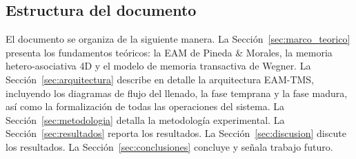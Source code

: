 \subsection*{Estructura del documento}

El documento se organiza de la siguiente manera.
La Sección~\ref{sec:marco_teorico} presenta los fundamentos teóricos: la EAM de Pineda
\& Morales, la memoria hetero-asociativa 4D y el modelo de memoria transactiva de Wegner.
La Sección~\ref{sec:arquitectura} describe en detalle la arquitectura EAM-TMS, incluyendo
los diagramas de flujo del llenado, la fase temprana y la fase madura, así como la
formalización de todas las operaciones del sistema.
La Sección~\ref{sec:metodologia} detalla la metodología experimental.
La Sección~\ref{sec:resultados} reporta los resultados.
La Sección~\ref{sec:discusion} discute los resultados.
La Sección~\ref{sec:conclusiones} concluye y señala trabajo futuro.
